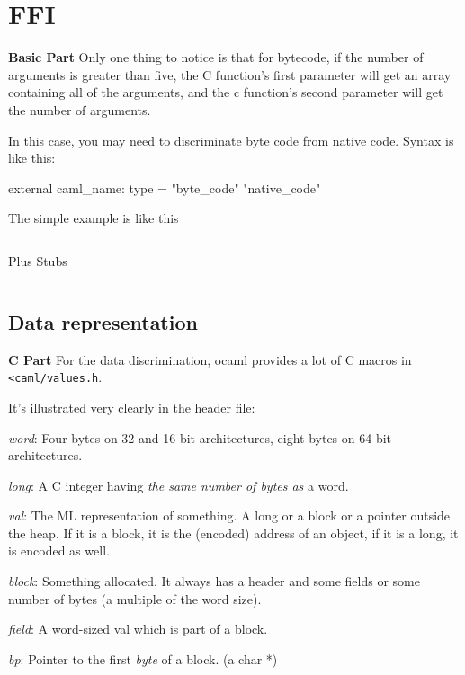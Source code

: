 \section{FFI}

\textbf{Basic Part} Only one thing to notice is that for bytecode, if
the number of arguments is greater than five, the C function's first
parameter will get an array containing all of the arguments, and the c
function's second parameter will get the number of arguments.

In this case, you may need to discriminate byte code from native
code. Syntax is like this:
\begin{ocamlcode}
external caml_name: type = "byte_code" "native_code"  
\end{ocamlcode}

The simple example is like this

\begin{listing}
  \inputminted[fontsize=\scriptsize,firstline=24,lastline=42]{c}{code/ffi/simple/plus_stubs.c}
  \caption{Plus Stubs}
  \label{lst:plus_stubs}
\end{listing}

\inputminted[fontsize=\scriptsize]{ocaml}{code/ffi/simple/plus.ml}

\subsection{Data representation}
\label{sec:data-representation}


\textbf{C Part} For the data discrimination, ocaml provides a lot of C
macros in \verb|<caml/values.h|.

It's illustrated very clearly in the header file:

\textit{word}: Four bytes on 32 and 16 bit architectures, eight bytes on 64 bit architectures.

\textit{long}: A C integer having \textit{the same number of bytes as}
a word.

\textit{val}: The ML representation of something. A long or a block or
a pointer outside the heap.  If it is a block, it is the (encoded)
address of an object, if it is a long, it is encoded as well.

\textit{block}: Something allocated.  It always has a header and some
fields or some number of bytes (a multiple of the word size).

\textit{field}: A word-sized val which is part of a block.

\textit{bp}: Pointer to the first \textit{byte} of a block.  (a char *)

